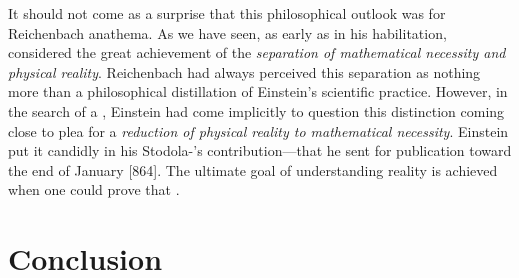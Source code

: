 \documentclass[draft]{article}
\begin{document}
It should not come as a surprise that this philosophical outlook was for Reichenbach anathema. As we have seen, as early as in his habilitation, considered  the great achievement of \rt the \emph{separation of mathematical necessity and physical reality}. Reichenbach had always perceived this separation as nothing more than a philosophical distillation of Einstein's scientific practice. However, in the search of a \uft, Einstein had come implicitly to question this distinction coming close to plea for a \emph{reduction of physical reality to mathematical necessity}. Einstein put it candidly in his Stodola-'s contribution---that he sent for publication toward the end of January [864]. The ultimate goal of understanding reality is achieved when one could prove that  \citep[127]{Einstein1929}.






\section{Conclusion}
\end{document}
